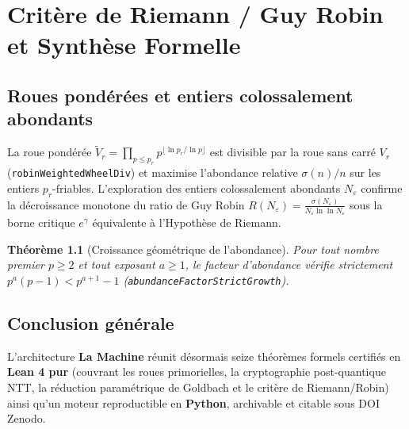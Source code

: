 \documentclass[11pt,a4paper,openany]{book}
\newtheorem{theoreme}{Théorème}[chapter]
\begin{document}
\chapter{Critère de Riemann / Guy Robin et Synthèse Formelle}

\section{Roues pondérées et entiers colossalement abondants}
La roue pondérée $\widetilde{V}_r = \prod_{p \le p_r} p^{\lfloor \ln p_r / \ln p \rfloor}$ est divisible par la roue sans carré $V_r$ (\texttt{robinWeightedWheelDiv}) et maximise l'abondance relative $\sigma(n)/n$ sur les entiers $p_r$-friables. L'exploration des entiers colossalement abondants $N_\varepsilon$ confirme la décroissance monotone du ratio de Guy Robin $R(N_\varepsilon) = \frac{\sigma(N_\varepsilon)}{N_\varepsilon \ln \ln N_\varepsilon}$ sous la borne critique $e^\gamma$ équivalente à l'Hypothèse de Riemann.

\begin{theoreme}[Croissance géométrique de l'abondance]
Pour tout nombre premier $p \ge 2$ et tout exposant $a \ge 1$, le facteur d'abondance vérifie strictement $p^a (p - 1) < p^{a+1} - 1$ (\texttt{abundanceFactorStrictGrowth}).
\end{theoreme}

\section{Conclusion générale}
L'architecture \textbf{La Machine} réunit désormais seize théorèmes formels certifiés en \textbf{Lean 4 pur} (couvrant les roues primorielles, la cryptographie post-quantique NTT, la réduction paramétrique de Goldbach et le critère de Riemann/Robin) ainsi qu'un moteur reproductible en \textbf{Python}, archivable et citable sous DOI Zenodo.
\end{document}
